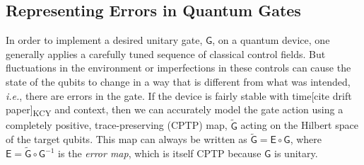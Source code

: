 \documentclass[aps,nofootinbib,pra,notitlepage,twocolumn]{revtex4-1}
\newcommand{\kcy}[1]{{\color{red}[#1]\textsubscript{\rm{KCY}}}}
\newcommand{\actual}{\ensuremath{\tilde{\mathsf{G}}}}
\newcommand{\target}{\ensuremath{{\mathsf{G}}}}
\newcommand{\error}{\ensuremath{{\mathsf{E}}}}
\newcommand{\0}{\ensuremath{\mathbf{0}}}
\begin{document}
\subsection{Representing Errors in Quantum Gates}
\label{sec:rep_errors}
\noindent In order to implement a desired unitary gate, $\target$, on a quantum device, one generally applies a carefully tuned sequence of classical control fields.  But fluctuations in the environment or imperfections in these controls can cause the state of the qubits to change in a way that is different from what was intended, \emph{i.e.}, there are errors in the gate. If the device is fairly stable with time\kcy{cite drift paper} and context\cite{Rudinger2019}, then we can accurately model the gate action using a completely positive, trace-preserving (CPTP) map, $\actual$ acting on the Hilbert space of the target qubits. This map can always be written as $\actual = \error\circ\target$, where $\error = \actual\circ\target^{-1}$ is the \emph{error map}, which is itself CPTP because $\target$ is unitary.
\end{document}
